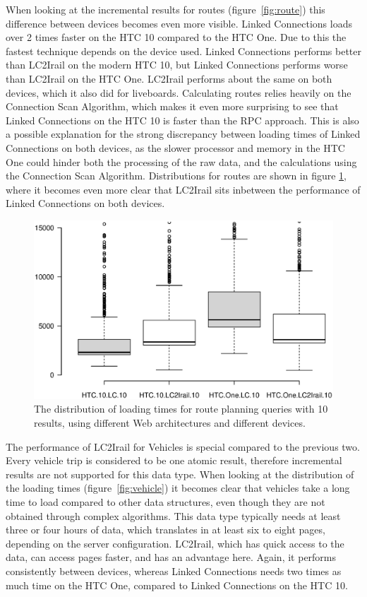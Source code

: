 \documentclass[twocolumn]{phdsymp} %
\begin{document}
When looking at the incremental results for routes (figure~\ref{fig:route}) this difference between devices becomes even more visible. Linked Connections loads over 2 times
faster on the HTC 10 compared to the HTC One. Due to this the fastest technique depends on the device used. Linked Connections performs better than LC2Irail on the modern HTC 10, but Linked Connections performs worse than LC2Irail on the HTC One. LC2Irail performs about the same on both devices, which it also did for liveboards. Calculating routes relies heavily on the Connection Scan Algorithm, which makes it even more surprising to see that Linked Connections on the HTC 10 is faster than the \textsc{RPC} approach. This is also a possible explanation for the strong discrepancy between loading times of Linked Connections on both devices, as the slower processor and memory in the HTC One could hinder both the processing of the raw data, and the calculations using the Connection Scan Algorithm. Distributions for routes are shown in figure \ref{fig:routebox}, where it becomes even more clear that LC2Irail sits inbetween the performance of Linked Connections on both devices.

\begin{figure}[ht]
	\begin{center}
		\includegraphics[trim=3cm 4cm 0 0, width=.50\textwidth]{images/boxplot_routes_10.eps}
		\caption{\label{fig:routebox} The distribution of loading times for route planning queries with 10 results, using different Web architectures and different devices. }
	\end{center}
\end{figure}

The performance of LC2Irail for Vehicles is special compared to the previous two. Every vehicle trip is considered to be one atomic result, therefore incremental results are not supported for this data type. When looking at the distribution of the loading times (figure~\ref{fig:vehicle}) it becomes clear that vehicles take a long time to load compared to other data structures, even though they are not obtained through complex algorithms. This data type typically needs at least three or four hours of data, which translates in at least six to eight pages, depending on the server configuration. LC2Irail, which has quick access to the data, can access pages faster, and has an advantage here. Again, it performs consistently between devices, whereas Linked Connections needs two times as much time on the HTC One, compared to Linked Connections on the HTC 10.
\end{document}
